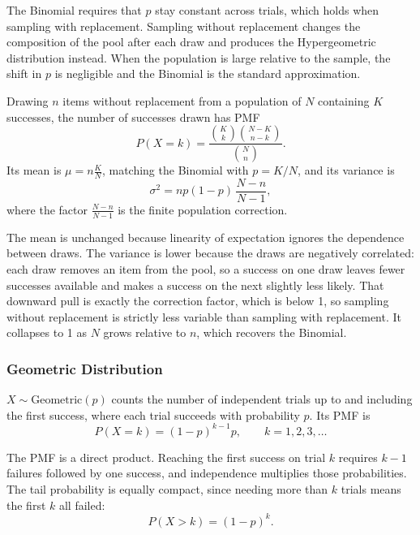 \newpage

\begin{keybox}
The Binomial requires that $p$ stay constant across trials, which holds when sampling with replacement. Sampling without replacement changes the composition of the pool after each draw and produces the Hypergeometric distribution instead. When the population is large relative to the sample, the shift in $p$ is negligible and the Binomial is the standard approximation.
\end{keybox}

\begin{definition}[Hypergeometric]
Drawing $n$ items without replacement from a population of $N$ containing $K$ successes, the number of successes drawn has PMF
\[
P(X = k) = \frac{\binom{K}{k}\binom{N-K}{n-k}}{\binom{N}{n}}.
\]
Its mean is $\mu = n\frac{K}{N}$, matching the Binomial with $p = K/N$, and its variance is
\[
\sigma^2 = np(1-p)\,\frac{N-n}{N-1},
\]
where the factor $\frac{N-n}{N-1}$ is the finite population correction.
\end{definition}

The mean is unchanged because linearity of expectation ignores the dependence between draws. The variance is lower because the draws are negatively correlated: each draw removes an item from the pool, so a success on one draw leaves fewer successes available and makes a success on the next slightly less likely. That downward pull is exactly the correction factor, which is below 1, so sampling without replacement is strictly less variable than sampling with replacement. It collapses to 1 as $N$ grows relative to $n$, which recovers the Binomial.

\subsubsection{Geometric Distribution}

\begin{definition}[Geometric]
$X \sim \text{Geometric}(p)$ counts the number of independent trials up to and including the first success, where each trial succeeds with probability $p$. Its PMF is
\[
P(X = k) = (1-p)^{k-1} p, \qquad k = 1, 2, 3, \dots
\]
\end{definition}

The PMF is a direct product. Reaching the first success on trial $k$ requires $k-1$ failures followed by one success, and independence multiplies those probabilities. The tail probability is equally compact, since needing more than $k$ trials means the first $k$ all failed:
\[
P(X > k) = (1-p)^k.
\]

